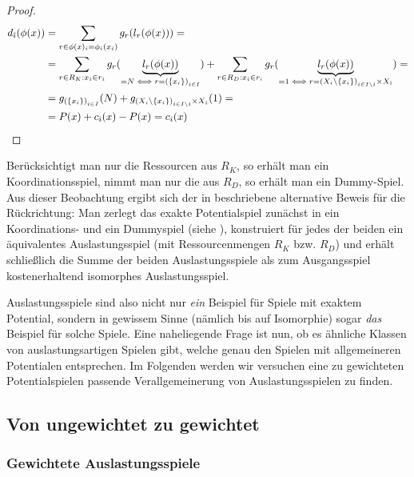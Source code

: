 \begin{proof}
	\begin{align*}
		d_{\hat{\imath}}(\phi(x)) 	&=\sum_{r \in \phi(x)_{\hat{\imath}} = \phi_{\hat{\imath}}(x_{\hat{\imath}})} g_r(l_r(\phi(x))) = \\
		&=\sum_{r \in R_K: x_{\hat{\imath}} \in r_{\hat{\imath}}} g_r(\underbrace{l_r(\phi(x))}_{= N \iff r = \left(\{x_i\}\right)_{i \in I}}) + \sum_{r \in R_D: x_{\hat{\imath}} \in r_i} g_r(\underbrace{l_r(\phi(x))}_{=1 \iff r = \left(X_i\setminus\{x_i\}\right)_{i \in I\setminus\hat{\imath}} \times X_{\hat{\imath}}}) = \\
		&=g_{\left(\{x_i\}\right)_{i \in I}}(N) + g_{\left(X_i\setminus\{x_i\}\right)_{i \in I\setminus\hat{\imath}} \times X_{\hat{\imath}}}(1) = \\
		&=P(x) + c_{\hat{\imath}}(x) - P(x) = c_{\hat{\imath}}(x) \qedhere									
		\end{align*}
\end{proof}

\begin{bem}
	Berücksichtigt man nur die Ressourcen aus $R_K$, so erhält man ein Koordinationsspiel, nimmt man nur die aus $R_D$, so erhält man ein Dummy-Spiel. Aus dieser Beobachtung ergibt sich der in \cite{KoordDummy} beschriebene alternative Beweis für die Rückrichtung: Man zerlegt das exakte Potentialspiel zunächst in ein Koordinations- und ein Dummyspiel (siehe ), konstruiert für jedes der beiden ein äquivalentes Auslastungsspiel (mit Ressourcenmengen $R_K$ bzw. $R_D$) und erhält schließlich die Summe der beiden Auslastungsspiele als zum Ausgangsspiel kostenerhaltend isomorphes Auslastungsspiel.
\end{bem}

Auslastungsspiele sind also nicht nur \emph{ein} Beispiel für Spiele mit exaktem Potential, sondern in gewissem Sinne (nämlich bis auf Isomorphie) sogar \emph{das} Beispiel für solche Spiele. Eine naheliegende Frage ist nun, ob es ähnliche Klassen von \glqq auslastungsartigen\grqq{} Spielen gibt, welche genau den Spielen mit allgemeineren Potentialen entsprechen. Im Folgenden werden wir versuchen eine zu gewichteten Potentialspielen passende Verallgemeinerung von Auslastungsspielen zu finden.

\subsection{Von ungewichtet zu gewichtet}

\subsubsection{Gewichtete Auslastungsspiele}

